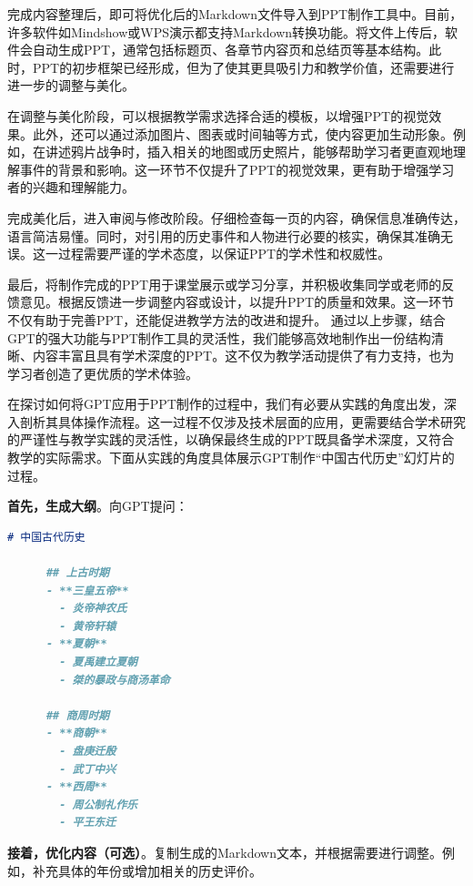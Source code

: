 完成内容整理后，即可将优化后的Markdown文件导入到PPT制作工具中。目前，许多软件如Mindshow或WPS演示都支持Markdown转换功能。将文件上传后，软件会自动生成PPT，通常包括标题页、各章节内容页和总结页等基本结构。此时，PPT的初步框架已经形成，但为了使其更具吸引力和教学价值，还需要进行进一步的调整与美化。

在调整与美化阶段，可以根据教学需求选择合适的模板，以增强PPT的视觉效果。此外，还可以通过添加图片、图表或时间轴等方式，使内容更加生动形象。例如，在讲述鸦片战争时，插入相关的地图或历史照片，能够帮助学习者更直观地理解事件的背景和影响。这一环节不仅提升了PPT的视觉效果，更有助于增强学习者的兴趣和理解能力。

完成美化后，进入审阅与修改阶段。仔细检查每一页的内容，确保信息准确传达，语言简洁易懂。同时，对引用的历史事件和人物进行必要的核实，确保其准确无误。这一过程需要严谨的学术态度，以保证PPT的学术性和权威性。

最后，将制作完成的PPT用于课堂展示或学习分享，并积极收集同学或老师的反馈意见。根据反馈进一步调整内容或设计，以提升PPT的质量和效果。这一环节不仅有助于完善PPT，还能促进教学方法的改进和提升。
通过以上步骤，结合GPT的强大功能与PPT制作工具的灵活性，我们能够高效地制作出一份结构清晰、内容丰富且具有学术深度的PPT。这不仅为教学活动提供了有力支持，也为学习者创造了更优质的学术体验。

在探讨如何将GPT应用于PPT制作的过程中，我们有必要从实践的角度出发，深入剖析其具体操作流程。这一过程不仅涉及技术层面的应用，更需要结合学术研究的严谨性与教学实践的灵活性，以确保最终生成的PPT既具备学术深度，又符合教学的实际需求。下面从实践的角度具体展示GPT制作``中国古代历史''幻灯片的过程。

\textbf{首先，生成大纲}。向GPT提问：


\begin{gptbox}
\small{
\begin{lstlisting}[language=Markdown]
      # 中国古代历史
      
      ## 上古时期
      - **三皇五帝**
        - 炎帝神农氏
        - 黄帝轩辕
      - **夏朝**
        - 夏禹建立夏朝
        - 桀的暴政与商汤革命
      
      ## 商周时期
      - **商朝**
        - 盘庚迁殷
        - 武丁中兴
      - **西周**
        - 周公制礼作乐
        - 平王东迁
\end{lstlisting}
}
\end{gptbox}


\textbf{接着，优化内容（可选）}。复制生成的Markdown文本，并根据需要进行调整。例如，补充具体的年份或增加相关的历史评价。


